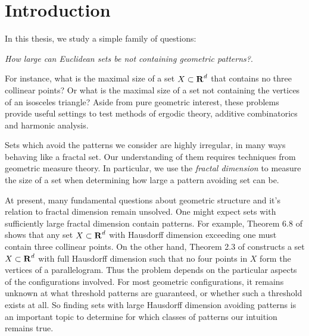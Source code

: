 
\chapter{Introduction}
\label{ch:Introduction}

In this thesis, we study a simple family of questions:
%
\begin{center}
	{\it How large can Euclidean sets be not containing geometric patterns?}.
\end{center}
%
For instance, what is the maximal size of a set $X \subset \operatorname{\mathbf{R}}^d$ that contains no three collinear points? Or what is the maximal size of a set not containing the vertices of an isosceles triangle? Aside from pure geometric interest, these problems provide useful settings to test methods of ergodic theory, additive combinatorics and harmonic analysis.

Sets which avoid the patterns we consider are highly irregular, in many ways behaving like a fractal set. Our understanding of them requires techniques from geometric measure theory. In particular, we use the \emph{fractal dimension} to measure the size of a set when determining how large a pattern avoiding set can be.



At present, many fundamental questions about geometric structure and it's relation to fractal dimension remain unsolved. One might expect sets with sufficiently large fractal dimension contain patterns. For example, Theorem 6.8 of \cite{Matilla} shows that any set $X \subset \operatorname{\mathbf{R}}^d$ with Hausdorff dimension exceeding one must contain three collinear points. On the other hand, Theorem 2.3 of \cite{Maga} constructs a set $X \subset \operatorname{\mathbf{R}}^d$ with full Hausdorff dimension such that no four points in $X$ form the vertices of a parallelogram. Thus the problem depends on the particular aspects of the configurations involved. For most geometric configurations, it remains unknown at what threshold patterns are guaranteed, or whether such a threshold exists at all. So finding sets with large Hausdorff dimension avoiding patterns is an important topic to determine for which classes of patterns our intuition remains true.


